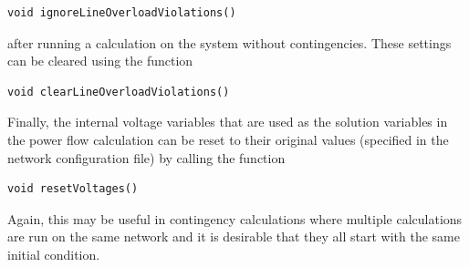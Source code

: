 {
\color{red}
\begin{Verbatim}[fontseries=b]
void ignoreLineOverloadViolations()
\end{Verbatim}
}

after running a calculation on the system without contingencies. These settings can be cleared using the function

{
\color{red}
\begin{Verbatim}[fontseries=b]
void clearLineOverloadViolations()
\end{Verbatim}
}

Finally, the internal voltage variables that are used as the solution variables in the power flow calculation can be reset to their original values (specified in the network configuration file) by calling the function

{
\color{red}
\begin{Verbatim}[fontseries=b]
void resetVoltages()
\end{Verbatim}
}

Again, this may be useful in contingency calculations where multiple calculations are run on the same network and it is desirable that they all start with the same initial condition.
\newline
\hyperlink{topDoc}{\color{blue}{Top}}
